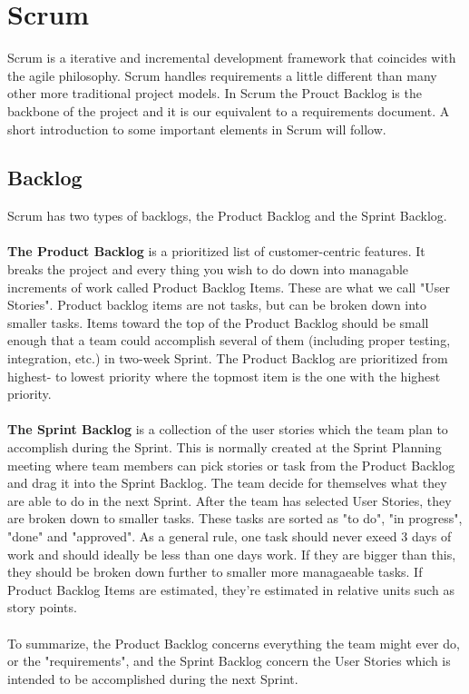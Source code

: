 \section{Scrum}
Scrum is a iterative and incremental development framework that coincides with the agile philosophy. Scrum handles requirements a little different than many other more traditional project models. In Scrum the Prouct Backlog is the backbone of the project and it is our equivalent to a requirements document. A short introduction to some important elements in Scrum will follow.  


\subsection{Backlog}
Scrum has two types of backlogs, the Product Backlog and the Sprint Backlog.
\\ \\ 
\textbf{The Product Backlog} is a prioritized list of customer-centric features. It breaks the project and every thing you wish to do down into managable increments of work called Product Backlog Items. These are what we call "User Stories". Product backlog items are not tasks, but can be broken down into smaller tasks. Items toward the top of the Product Backlog should be small enough that a team could accomplish several of them (including proper testing, integration, etc.) in two-week Sprint. The Product Backlog are prioritized from highest- to lowest priority where the topmost item is the one with the highest priority.   
\\ \\ 
\textbf{The Sprint Backlog} is a collection of the user stories which the team plan to accomplish during the Sprint. This is normally created at the Sprint Planning meeting where team members can pick stories or task from the Product Backlog and drag it into the Sprint Backlog. The team decide for themselves what they are able to do in the next Sprint. After the team has selected User Stories, they are broken down to smaller tasks. These tasks are sorted as "to do", "in progress", "done" and "approved". As a general rule, one task should never exeed 3 days of work and should ideally be less than one days work. If they are bigger than this, they should be broken down further to smaller more managaeable tasks. If Product Backlog Items are estimated, they’re estimated in relative units such as story points.
\\ \\ 
To summarize, the Product Backlog concerns everything the team might ever do, or the "requirements", and the Sprint Backlog concern the User Stories which is intended to be accomplished during the next Sprint.  
  
